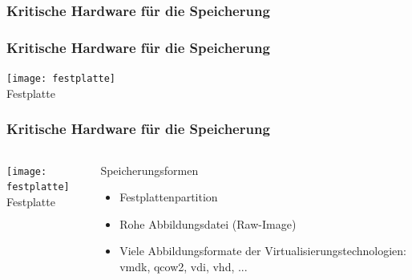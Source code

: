 \documentclass{beamer}
\begin{document}
\begin{frame}
\frametitle{Kritische Hardware für die Speicherung} 
\fontsize{20pt}{25pt} \selectfont
\begin{itemize}
\end{itemize}
\end{frame}

\begin{frame}
\frametitle{Kritische Hardware für die Speicherung} 
\begin{center}
 \texttt{[image: festplatte]} \\ Festplatte
\end{center}

\end{frame}

\begin{frame}
\frametitle{Kritische Hardware für die Speicherung} 


\begin{columns}
\column{3.8cm} 
\begin{center}
 \texttt{[image: festplatte]} \\ Festplatte
\end{center}
\column{6cm} 
\begin{block}{Speicherungsformen}
 \begin{itemize}
 \item Festplattenpartition \pause
 \item Rohe Abbildungsdatei (Raw-Image) \pause
 \item Viele Abbildungsformate der Virtualisierungstechnologien: vmdk, qcow2, vdi, vhd, ...
 \end{itemize}
\end{block}
\end{columns}
\end{frame}
\end{document}
